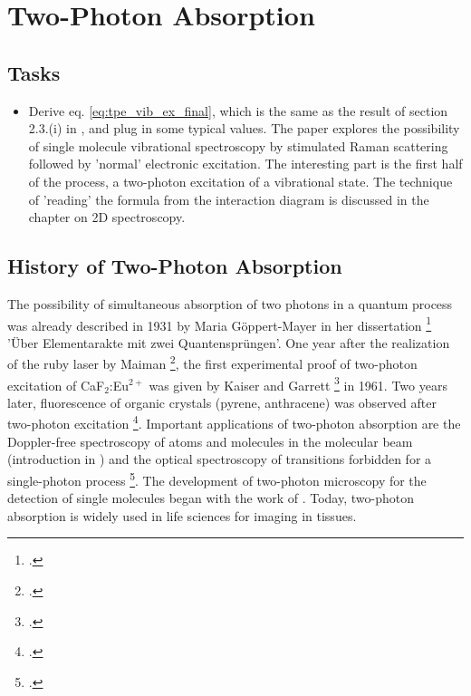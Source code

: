 \renewcommand{\lastmod}{June 21, 2024}
\renewcommand{\chapterauthors}{Markus Lippitz}


\chapter{Two-Photon Absorption}


\section{Tasks}

\begin{itemize}
\item Derive eq. \ref{eq:tpe_vib_ex_final}, which is the same as the result of section 2.3.(i) in \cite{Winterhalder11}, and plug in some typical values. The paper explores the possibility of single molecule vibrational spectroscopy by stimulated Raman scattering followed by 'normal' electronic excitation. The interesting part is the first half of the process, a two-photon excitation of a vibrational state. The technique of 'reading' the formula from the interaction diagram is discussed in the chapter on 2D spectroscopy.
\end{itemize}



\section{History of Two-Photon Absorption}

The possibility of simultaneous absorption of two photons in a quantum process was already described in 1931 by Maria Göppert-Mayer in her dissertation \footcite[On Elementary Acts with Two Quantum Leaps]{goeppert31} 'Über Elementarakte mit zwei Quantensprüngen'. One year after the realization of the ruby laser by Maiman \footcite{maiman60}, the first experimental proof of two-photon excitation of CaF$_2$:Eu$^{2+}$ was given by Kaiser and Garrett \footcite{Kaiser61} in 1961. Two years later, fluorescence of organic crystals (pyrene, anthracene) was observed after two-photon excitation \footcite{Peticolas63}.  Important applications of two-photon absorption are the Doppler-free spectroscopy of atoms and molecules in the molecular beam (introduction in \cite{Demtroeder_laser}) and the optical spectroscopy of transitions forbidden for a single-photon process \footcite{birge86}. The development of two-photon microscopy for the detection of single molecules began with the work of \cite{denk90}. Today, two-photon absorption is widely used in life sciences for imaging in tissues.




